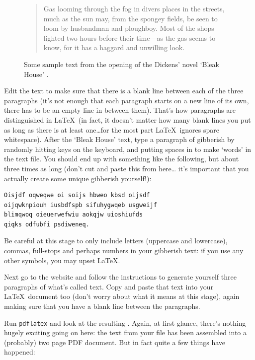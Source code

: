 \begin{refsection}
\begin{figure}[tbp]
\begin{quote}
Gas looming through the fog in divers places in the streets, much as
the sun may, from the spongey fields, be seen to loom by husbandman
and ploughboy. Most of the shops lighted two hours before their
time---as the gas seems to know, for it has a haggard and unwilling
look.

\end{quote}

\caption{Some sample text from the opening of the Dickens' novel `Bleak House' \citep{dickens1852}.}\label{figure:bleakhouse}
\end{figure}

Edit the text to make sure that there is a blank line between each of
the three paragraphs (it's not enough that each paragraph starts on a
new line of its own, there has to be an empty line in between
them). That's how paragraphs are distinguished in \LaTeX\ (in fact, it
doesn't matter how many blank lines you put as long as there is at
least one\ldots for the most part \LaTeX\ ignores spare
whitespace). After the `Bleak House' text, type a paragraph of gibberish by randomly hitting
keys on the keyboard, and putting spaces in to make `words' in the
text file. You should end up with something like the following, but
about three times as long (don't cut and paste this from here\ldots
it's important that you actually create some unique gibberish
yourself!):

\begin{verbatim}
Oisjdf oqweqwe oi soijs hbweo kbsd oijsdf 
oijqwknpiouh iusbdfspb sifuhygwqeb usgweijf 
blimqwoq oieuerwefwiu aokqjw uioshiufds 
qiqks odfubfi psdiweneq.
\end{verbatim}

Be careful at this stage to only include letters (uppercase and lowercase), commas, full-stops and perhaps numbers in your gibberish text: if you use any other symbols, you may upset \LaTeX. 

Next go to the website  and follow the instructions to generate yourself three paragraphs of what's called  text. Copy and paste that text into your \LaTeX\ document too (don't worry about what it means at this stage), again making sure that you have a blank line between the paragraphs.

Run \texttt{pdflatex} and look at the resulting . Again, at first glance, there's nothing hugely exciting going on here: the text from your  file has been assembled into a (probably) two page PDF document. But in fact quite a few things have happened: 


\end{refsection}
